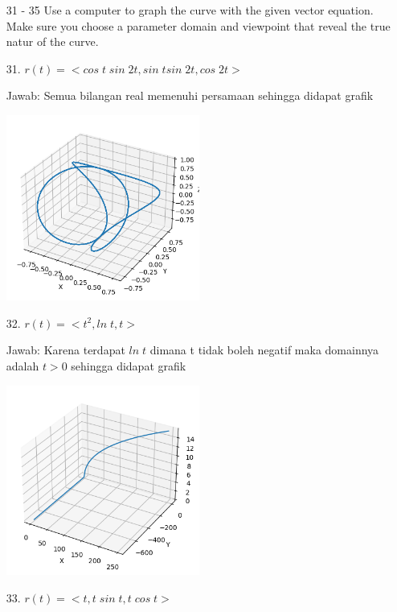 \documentclass[twoside]{scrarticle}
\begin{document}
\begin{enumerate}
\item[31 - 35] Use a computer to graph the curve with the given vector equation. 
Make sure you choose a parameter domain and viewpoint that reveal the true natur 
of the curve.
\item[31.] $r(t) = <cos\;t\;sin\;2t, sin\;tsin\;2t, cos\;2t>$

Jawab: Semua bilangan real memenuhi persamaan sehingga didapat grafik

\begin{minipage}{\linewidth}
    \includegraphics[width=0.5\textwidth]{31.png}
    \centering
\end{minipage}

\item[32.] $r(t) = <t^2, ln\;t, t>$

Jawab: Karena terdapat $ln\;t$ dimana t tidak boleh negatif maka domainnya adalah $t > 0$ sehingga didapat grafik

\begin{minipage}{\linewidth}
    \includegraphics[width=0.5\textwidth]{32.png}
    \centering
\end{minipage}
\item[33.] $r(t) = <t, t\;sin\;t, t\;cos\;t> $


\end{enumerate}
\end{document}
